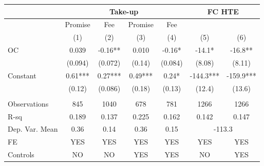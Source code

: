 \begin{tabular}{lcccccc}
\toprule
      & \multicolumn{4}{c}{Take-up}   & \multicolumn{2}{c}{FC HTE} \\
\midrule
\midrule
      & Promise & Fee   & Promise & Fee   &       &  \\
\midrule
      & (1)   & (2)   & (3)   & (4)   & (5)   & (6) \\
\midrule
\midrule
OC    & 0.039 & -0.16** & 0.010 & -0.16* & -14.1* & -16.8** \\
      & (0.094) & (0.072) & (0.14) & (0.084) & (8.08) & (8.11) \\
Constant  & 0.61*** & 0.27*** & 0.49*** & 0.24* & -144.3*** & -159.9*** \\
      & (0.12) & (0.086) & (0.18) & (0.13) & (12.4) & (13.6) \\
      &       &       &       &       &       &  \\
\midrule
Observations & 845   & 1040  & 678   & 781   & 1266  & 1266 \\
R-sq  & 0.189 & 0.137 & 0.225 & 0.162 & 0.142 & 0.147 \\
Dep. Var. Mean & 0.36  & 0.14  & 0.36  & 0.15  & \multicolumn{2}{c}{-113.3} \\
FE    & YES   & YES   & YES   & YES   & YES   & YES \\
Controls & NO    & NO    & YES   & YES   & NO    & YES \\
\bottomrule
\bottomrule
\end{tabular}%
